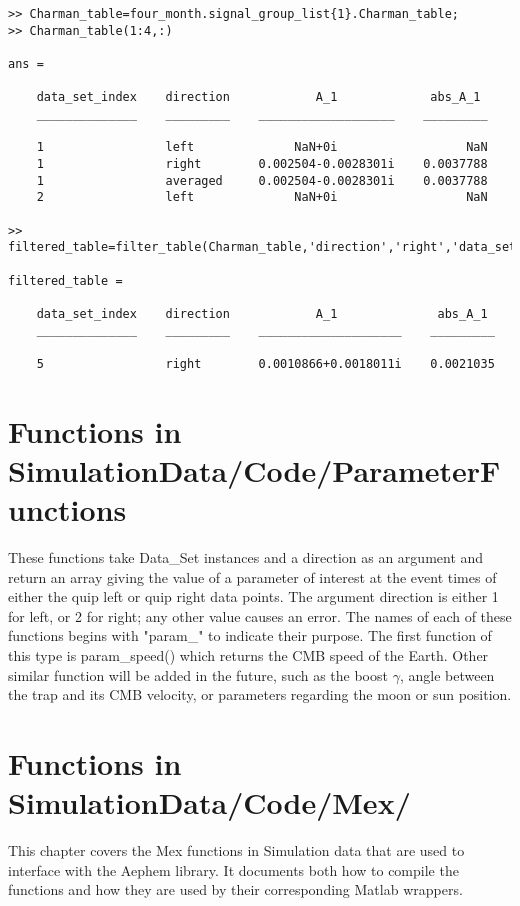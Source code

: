 \documentclass[12pt]{report}
\begin{document}
\begin{verbatim}
>> Charman_table=four_month.signal_group_list{1}.Charman_table;
>> Charman_table(1:4,:)

ans = 

    data_set_index    direction            A_1             abs_A_1 
    ______________    _________    ___________________    _________

    1                 left              NaN+0i                  NaN
    1                 right        0.002504-0.0028301i    0.0037788
    1                 averaged     0.002504-0.0028301i    0.0037788
    2                 left              NaN+0i                  NaN

>> filtered_table=filter_table(Charman_table,'direction','right','data_set_index',5)

filtered_table = 

    data_set_index    direction            A_1              abs_A_1 
    ______________    _________    ____________________    _________

    5                 right        0.0010866+0.0018011i    0.0021035
\end{verbatim}





\chapter{Functions in SimulationData/Code/ParameterFunctions}
These functions take Data\_Set instances and a direction as an argument and return an array giving the value of a parameter of interest at the event times of either the quip left or quip right data points.  The argument direction is either 1 for left, or 2 for right; any other value causes an error.  The names of each of these functions begins with "param\_" to indicate their purpose.  The first function of this type is param\_speed() which returns the CMB speed of the Earth.  Other similar function will be added in the future, such as the boost $\gamma$, angle between the trap and its CMB velocity, or parameters regarding the moon or sun position.







\chapter{Functions in SimulationData/Code/Mex/}
\label{chap:Mex}
This chapter covers the Mex functions in Simulation data that are used to interface with the Aephem library.  It documents both how to compile the functions and how they are used by their corresponding Matlab wrappers.
\end{document}
